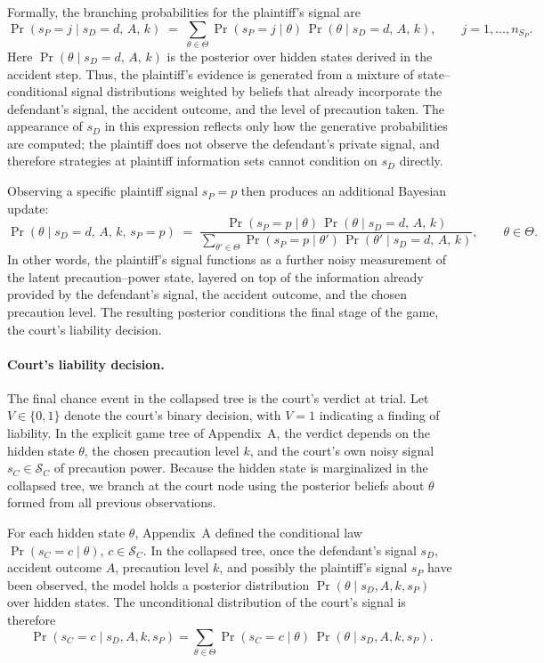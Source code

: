 \documentclass{article}
\begin{document}
Formally, the branching probabilities for the plaintiff’s signal are
\[
\Pr(s_P=j \mid s_D=d,\,A,\,k)
\;=\;\sum_{\theta\in\Theta} \Pr(s_P=j \mid \theta)\,\Pr(\theta \mid s_D=d,\,A,\,k),
\qquad j=1,\dots,n_{S_P}.
\]
Here $\Pr(\theta \mid s_D=d,\,A,\,k)$ is the posterior over hidden states derived in the accident step. Thus, the plaintiff’s evidence is generated from a mixture of state–conditional signal distributions weighted by beliefs that already incorporate the defendant’s signal, the accident outcome, and the level of precaution taken. The appearance of $s_D$ in this expression reflects only how the generative probabilities are computed; the plaintiff does not observe the defendant’s private signal, and therefore strategies at plaintiff information sets cannot condition on $s_D$ directly.

Observing a specific plaintiff signal $s_P=p$ then produces an additional Bayesian update:
\[
\Pr(\theta \mid s_D=d,\,A,\,k,\,s_P=p)
\;=\;
\frac{\Pr(s_P=p \mid \theta)\,\Pr(\theta \mid s_D=d,\,A,\,k)}
{\sum_{\theta'\in\Theta} \Pr(s_P=p \mid \theta')\,\Pr(\theta' \mid s_D=d,\,A,\,k)},
\qquad \theta\in\Theta.
\]
In other words, the plaintiff’s signal functions as a further noisy measurement of the latent precaution–power state, layered on top of the information already provided by the defendant’s signal, the accident outcome, and the chosen precaution level. The resulting posterior conditions the final stage of the game, the court’s liability decision.

\paragraph{Court’s liability decision.} The final chance event in the collapsed tree is the court’s verdict at trial. Let $V\in\{0,1\}$ denote the court’s binary decision, with $V=1$ indicating a finding of liability. In the explicit game tree of Appendix~A, the verdict depends on the hidden state $\theta$, the chosen precaution level $k$, and the court’s own noisy signal $s_C\in\mathcal{S}_C$ of precaution power. Because the hidden state is marginalized in the collapsed tree, we branch at the court node using the posterior beliefs about $\theta$ formed from all previous observations.

For each hidden state $\theta$, Appendix~A defined the conditional law $\Pr(s_C=c\mid \theta)$, $c\in\mathcal{S}_C$. In the collapsed tree, once the defendant’s signal $s_D$, accident outcome $A$, precaution level $k$, and possibly the plaintiff’s signal $s_P$ have been observed, the model holds a posterior distribution $\Pr(\theta \mid s_D, A, k, s_P)$ over hidden states. The unconditional distribution of the court’s signal is therefore
\[
\Pr(s_C=c \mid s_D, A, k, s_P)
= \sum_{\theta\in\Theta} \Pr(s_C=c\mid \theta)\,\Pr(\theta \mid s_D, A, k, s_P).
\]
\end{document}

